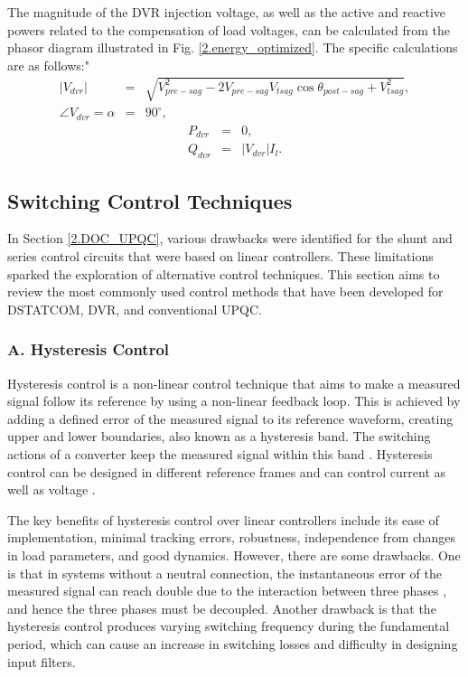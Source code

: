 The magnitude of the DVR injection voltage, as well as the active and reactive powers related to the compensation of load voltages, can be calculated from the phasor diagram illustrated in Fig. \ref{2.energy_optimized}. The specific calculations are as follows:"
\begin{eqnarray}
\label{2.Energy_optimized}
\left|V_{dvr}\right| &=& \sqrt{V^{2}_{pre-sag}-2V^{}_{pre-sag}V^{}_{tsag}\cos\theta_{post-sag}+V^{2}_{tsag}} \label{2.EO11},\\
\angle V_{dvr} = \alpha &=&90^{\circ}, \label{2.EO12}
\end{eqnarray}
\begin{eqnarray}
P_{dvr} &=& 0, \label{2.EO13}\\
Q_{dvr} &=& \left|V_{dvr}\right| I_{l}\label{2.EO14}.
\end{eqnarray}

\subsection {Switching Control Techniques}

In Section \ref{2.DOC_UPQC}, various drawbacks were identified for the shunt and series control circuits that were based on linear controllers. These limitations sparked the exploration of alternative control techniques. This section aims to review the most commonly used control methods that have been developed for DSTATCOM, DVR, and conventional UPQC. 
\vspace*{-1.5cm}
\subsubsection{A. Hysteresis Control} \vspace*{-0.5cm}
Hysteresis control is a non-linear control technique that aims to make a measured signal follow its reference by using a non-linear feedback loop. This is achieved by adding a defined error of the measured signal to its reference waveform, creating upper and lower boundaries, also known as a hysteresis band. The switching actions of a converter keep the measured signal within this band \cite{605621}. Hysteresis control can be designed in different reference frames and can control current as well as voltage \cite{5951759,4510107, 4766427}.

The key benefits of hysteresis control over linear controllers include its ease of implementation, minimal tracking errors, robustness, independence from changes in load parameters, and good dynamics. However, there are some drawbacks. One is that in systems without a neutral connection, the instantaneous error of the measured signal can reach double due to the interaction between three phases \cite{720325}, and hence the three phases must be decoupled. Another drawback is that the hysteresis control produces varying switching frequency during the fundamental period, which can cause an increase in switching losses and difficulty in designing input filters.

